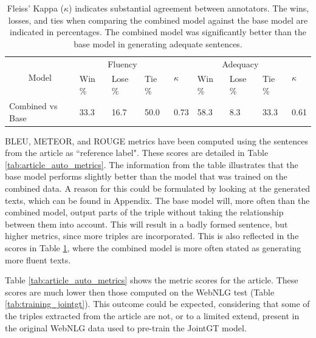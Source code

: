 \documentclass[
hf, %
]{ceurart}
\begin{document}
\begin{table}[ht]
\caption{Fleiss' Kappa ($\kappa$) indicates substantial agreement between annotators. The wins, losses, and ties when comparing the combined model against the base model are indicated in percentages. The combined model was significantly better than the base model in generating adequate sentences.}

\centering
\begin{tabular}{|c|lll|l|lll|l|}
\hline
\multirow{2}{*}{Model}                 & \multicolumn{3}{c|}{Fluency}                                        & \multirow{2}{*}{$\kappa$} & \multicolumn{3}{c|}{Adequacy}                                       & \multirow{2}{*}{$\kappa$} \\ \cline{2-4} \cline{6-8}
                                       & \multicolumn{1}{l|}{Win \%} & \multicolumn{1}{l|}{Lose \%} & Tie \% &                    & \multicolumn{1}{l|}{Win \%} & \multicolumn{1}{l|}{Lose \%} & Tie \% &                    \\ \hline
\multicolumn{1}{|l|}{Combined vs Base} & \multicolumn{1}{l|}{33.3}   & \multicolumn{1}{l|}{16.7}    & 50.0   & 0.73               & \multicolumn{1}{l|}{58.3}   & \multicolumn{1}{l|}{8.3}     & 33.3   & 0.61               \\ \hline
\end{tabular}
\label{tab:article_annotations}
\end{table}

BLEU, METEOR, and ROUGE metrics have been computed using the sentences from the article as ``reference label". These scores are detailed in Table \ref{tab:article_auto_metrics}. The information from the table illustrates that the base model performs slightly better than the model that was trained on the combined data. A reason for this could be formulated by looking at the generated texts, which can be found in Appendix. The base model will, more often than the combined model, output parts of the triple without taking the relationship between them into account. This will result in a badly formed sentence, but higher metrics, since more triples are incorporated. This is also reflected in the scores in Table \ref{tab:article_annotations}, where the combined model is more often stated as generating more fluent texts.

Table \ref{tab:article_auto_metrics} shows the metric scores for the article. These scores are much lower then those computed on the WebNLG test (Table \ref{tab:training_jointgt}). This outcome could be expected, considering that some of the triples extracted from the article are not, or to a limited extend, present in the original WebNLG data used to pre-train the JointGT model.
\end{document}
